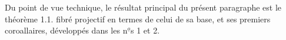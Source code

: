 
Du point de  vue technique, le résultat principal du présent paragraphe
est le théorème 1.1.  
 fibré projectif  en termes de celui de sa base, et ses premiers
coroallaires, développés dans les n$^{\underline{o}}$s 1 et 2.

